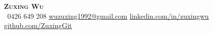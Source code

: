\begin{center}
    \textbf{\Huge \scshape Zuxing Wu} \\ \vspace{1pt}
     \ \small 0426 649 208 \quad
    \href{mailto:wuzuxing1992@gmail.com}{ \underline{wuzuxing1992@gmail.com}} \quad
    \href{https://www.linkedin.com/in/zuxingwu/}{ \underline{linkedin.com/in/zuxingwu}} \quad
    \href{https://github.com/ZuxingGit}{ \underline{github.com/ZuxingGit}}
\end{center}